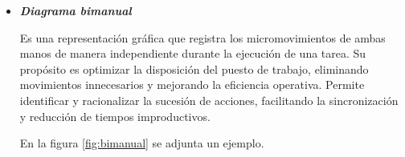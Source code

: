 \documentclass[a4paper,oneside,11pt]{article}
\begin{document}
\begin{itemize}
        Permite representar de manera gráfica y detallada la sucesión de actividades en un proceso productivo. Puede aplicarse a distintos elementos dentro de la producción:
        \begin{itemize}
            \item Del operario: Registra las actividades realizadas por un trabajador en un proceso determinado.
            \item Del material: Muestra el flujo del material a lo largo del proceso productivo.
            \item De la máquina o equipo: Representa el uso y funcionamiento de una máquina o equipo en la producción.
        \end{itemize}
        Se registra el desarrollo del trabajo en una hoja proforma, detallando cada operación, inspección, transporte, demora y almacenamiento. Se utiliza la simbología indicada anteriormente. En el anexo, justamente en la figura \ref{fig:proforma} podemos identificar un ejemplo.
    \item \textbf{\textit{Diagrama bimanual}}
    
        Es una representación gráfica que registra los micromovimientos de ambas manos de manera independiente durante la ejecución de una tarea. Su propósito es optimizar la disposición del puesto de trabajo, eliminando movimientos innecesarios y mejorando la eficiencia operativa. Permite identificar y racionalizar la sucesión de acciones, facilitando la sincronización y reducción de tiempos improductivos.

        En la figura \ref{fig:bimanual} se adjunta un ejemplo. \label{ref:volver3}
    
\end{itemize}
\end{document}
